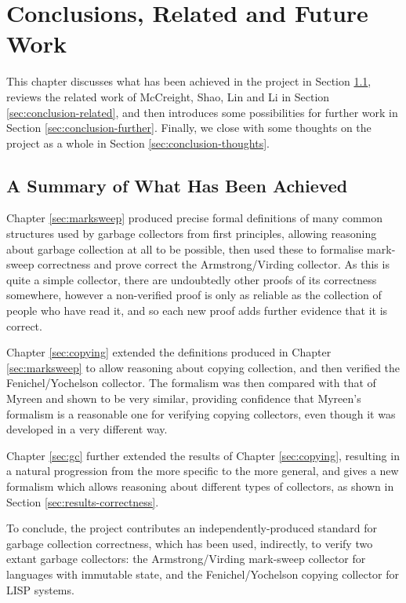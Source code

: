 \chapter{Conclusions, Related and Future Work}
\label{sec:conclusion}

This chapter discusses what has been achieved in the project in
Section \ref{sec:conclusion-review}, reviews the related work of
McCreight, Shao, Lin and Li\cite{McCreight07} in Section
\ref{sec:conclusion-related}, and then introduces some possibilities
for further work in Section \ref{sec:conclusion-further}. Finally, we
close with some thoughts on the project as a whole in Section
\ref{sec:conclusion-thoughts}.

\section{A Summary of What Has Been Achieved}
\label{sec:conclusion-review}

Chapter \ref{sec:marksweep} produced precise formal definitions of
many common structures used by garbage collectors from first
principles, allowing reasoning about garbage collection at all to be
possible, then used these to formalise mark-sweep correctness and
prove correct the Armstrong/Virding collector. As this is quite a
simple collector, there are undoubtedly other proofs of its
correctness somewhere, however a non-verified proof is only as
reliable as the collection of people who have read it, and so each new
proof adds further evidence that it is correct.

Chapter \ref{sec:copying} extended the definitions produced in Chapter
\ref{sec:marksweep} to allow reasoning about copying collection, and
then verified the Fenichel/Yochelson collector. The formalism was then
compared with that of Myreen\cite{Myreen10} and shown to be very
similar, providing confidence that Myreen's formalism is a reasonable
one for verifying copying collectors, even though it was developed in
a very different way.

Chapter \ref{sec:gc} further extended the results of Chapter
\ref{sec:copying}, resulting in a natural progression from the more
specific to the more general, and gives a new formalism which allows
reasoning about different types of collectors, as shown in Section
\ref{sec:results-correctness}.

To conclude, the project contributes an independently-produced
standard for garbage collection correctness, which has been used,
indirectly, to verify two extant garbage collectors: the
Armstrong/Virding mark-sweep collector for languages with immutable
state, and the Fenichel/Yochelson copying collector for LISP systems.

